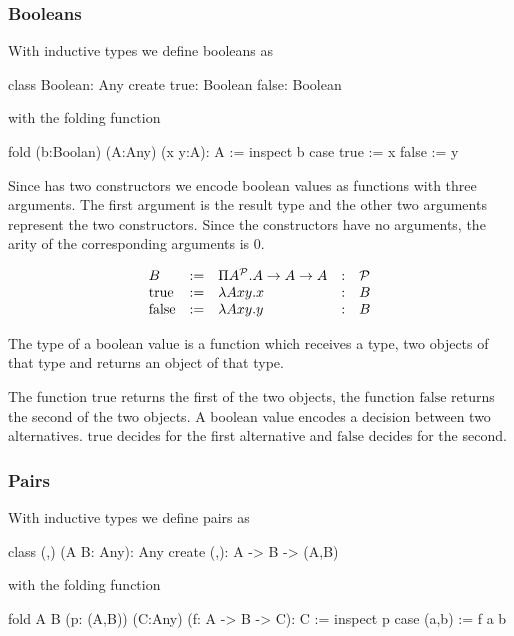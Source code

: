 \subsubsection{Booleans}

With inductive types we define booleans as
\begin{alba}
  class Boolean: Any create
    true:  Boolean
    false: Boolean
\end{alba}
%
with the folding function
%
\begin{alba}
  fold (b:Boolan) (A:Any) (x y:A): A :=
    inspect b case
      true :=
         x
      false :=
         y
\end{alba}


Since  has two constructors we encode boolean values as
functions with three arguments. The first argument is the result type and the
other two arguments represent the two constructors. Since the constructors
have no arguments, the arity of the corresponding arguments is 0.

$$
\begin{array}{lllll}
  B & :=
  & \Pi A^{\cal{P}} . A \to A \to A
  &:
  & {\cal{P}}
  \\
  \text{true} &:=
  & \lambda A x y . x
  &: & B
  \\
  \text{false} &:=
  & \lambda A x y . y
  &: & B
\end{array}
$$

The type of a boolean value is a function which receives a type, two objects
of that type and returns an object of that type.

The function $\text{true}$ returns the first of the two objects, the function
$\text{false}$ returns the second of the two objects. A boolean value encodes
a decision between two alternatives.  $\text{true}$ decides for the first
alternative and $\text{false}$ decides for the second.



\subsubsection{Pairs}

With inductive types we define pairs as
\begin{alba}
  class (,) (A B: Any): Any create
    (,): A -> B -> (A,B)
\end{alba}
%
with the folding function
%
\begin{alba}
  fold A B (p: (A,B)) (C:Any) (f: A -> B -> C): C :=
    inspect p case
      (a,b) :=
         f a b
\end{alba}

